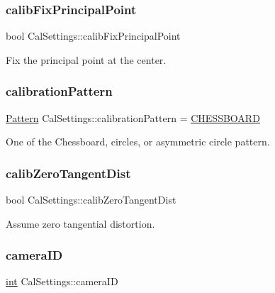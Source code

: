 \subsubsection{\texorpdfstring{calibFixPrincipalPoint}{calibFixPrincipalPoint}}
{\footnotesize\ttfamily bool Cal\+Settings\+::calib\+Fix\+Principal\+Point}



Fix the principal point at the center. 

\mbox{\label{class_cal_settings_a500d222eca5419dcf8d3923b8f9d45a1}} 
\subsubsection{\texorpdfstring{calibrationPattern}{calibrationPattern}}
{\footnotesize\ttfamily \mbox{\hyperlink{class_cal_settings_a0a24f2a2a233efe9213f28e527314500}{Pattern}} Cal\+Settings\+::calibration\+Pattern = \mbox{\hyperlink{class_cal_settings_a0a24f2a2a233efe9213f28e527314500abbce277bb8f1f2450efbf10d14258264}{C\+H\+E\+S\+S\+B\+O\+A\+RD}}}



One of the Chessboard, circles, or asymmetric circle pattern. 

\mbox{\label{class_cal_settings_a77e82318d82b8325bc0d4e87d08b732c}} 
\subsubsection{\texorpdfstring{calibZeroTangentDist}{calibZeroTangentDist}}
{\footnotesize\ttfamily bool Cal\+Settings\+::calib\+Zero\+Tangent\+Dist}



Assume zero tangential distortion. 

\mbox{\label{class_cal_settings_a94ef868bedd92ddce22dfebc25df9d1f}} 
\subsubsection{\texorpdfstring{cameraID}{cameraID}}
{\footnotesize\ttfamily \mbox{\hyperlink{draw_8hh_aa620a13339ac3a1177c86edc549fda9b}{int}} Cal\+Settings\+::camera\+ID}

